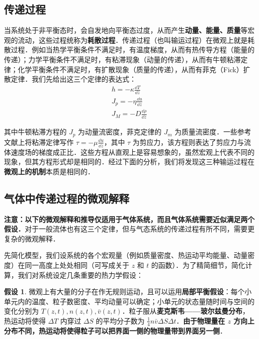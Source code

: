 \subsection{传递过程}
当系统处于非平衡态时，会自发地向平衡态过度，从而产生\textbf{动量、能量、质量}等宏观的流动，这些过程统称为\textbf{耗散过程}．传递过程（也叫输运过程）在微观上就是耗散过程．例如当热学平衡条件不满足时，有温度梯度，从而有热传导方程（能量的传递）；力学平衡条件不满足时，有粘滞现象（动量的传递），从而有牛顿粘滞定律；化学平衡条件不满足时，有扩散现象（质量的传递），从而有菲克（Fick）扩散定律．我们先给出这三个定律的表达式：
\begin{align}
h=-\kappa \frac{\dd T}{\dd z}\\
J_p=-\eta \frac{\dd u}{\dd z}\\
J_M=-D\frac{\dd \rho}{\dd z}
\end{align}

其中牛顿粘滞方程的 $J_p$ 为动量流密度，菲克定律的 $J_m$ 为质量流密度．一些参考文献上将粘滞定律写作 $\tau = -\mu \frac{\dd u}{\dd z}$，其中 $\tau$ 为剪应力，该方程则表达了剪应力与流体速度场的梯度成正比．这些方程从直观上是容易想象的，虽然宏观上代表不同的现象，但其方程形式却是相同的．经过下面的分析，我们将发现这三种输运过程在\textbf{微观上的机制}本质是相同的．

\subsection{气体中传递过程的微观解释}
\textbf{注意：以下的微观解释和推导仅适用于\textbf{气体系统}，而且气体系统需要近似满足两个假设．}对于一般流体也有这三个定律，但与气态系统的传递过程有所不同，需要更复杂的微观解释．

先简化模型，我们设系统的各个宏观量（例如质量密度、热运动平均能量、动量密度）在同一高度上处处相同（可写成关于 $z$ 和 $t$ 的函数）．为了精简细节，简化计算，我们对系统设定几条重要的热力学假设：

\textbf{假设 1}. 微观上有大量的分子在作无规则运动，且可以运用\textbf{局部平衡假设}：每个小单元内的温度、粒子数密度、平均动量可以确定；小单元的状态量随时间与空间的变化分别为 $T(z,t),n(z,t),\bar v(z,t)$．粒子服从\textbf{麦克斯韦——玻尔兹曼分布}，热运动将使得 $\Delta T$ 内穿过 $\Delta S$ 的平均分子数为 $\frac{1}{4}n\bar v \Delta S\Delta t$．\textbf{由于物理量在 $z$ 方向上分布不同，热运动将使得粒子可以把界面一侧的物理量带到界面另一侧}．

